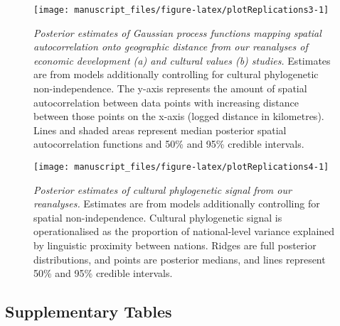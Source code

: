 \documentclass[
  man,floatsintext]{apa6}
\begin{document}
\newpage



\begin{figure}[H]
\texttt{[image: manuscript\_files/figure-latex/plotReplications3-1]} \caption{\emph{Posterior estimates of Gaussian process functions mapping spatial autocorrelation onto geographic distance from our reanalyses of economic development (a) and cultural values (b) studies.} Estimates are from models additionally controlling for cultural phylogenetic non-independence. The y-axis represents the amount of spatial autocorrelation between data points with increasing distance between those points on the x-axis (logged distance in kilometres). Lines and shaded areas represent median posterior spatial autocorrelation functions and 50\% and 95\% credible intervals.}\label{fig:plotReplications3}
\end{figure}

\newpage



\begin{figure}[H]
\texttt{[image: manuscript\_files/figure-latex/plotReplications4-1]} \caption{\emph{Posterior estimates of cultural phylogenetic signal from our reanalyses.} Estimates are from models additionally controlling for spatial non-independence. Cultural phylogenetic signal is operationalised as the proportion of national-level variance explained by linguistic proximity between nations. Ridges are full posterior distributions, and points are posterior medians, and lines represent 50\% and 95\% credible intervals.}\label{fig:plotReplications4}
\end{figure}

\newpage

\hypertarget{supplementary-tables}{%
\subsection{Supplementary Tables}\label{supplementary-tables}}
\end{document}
